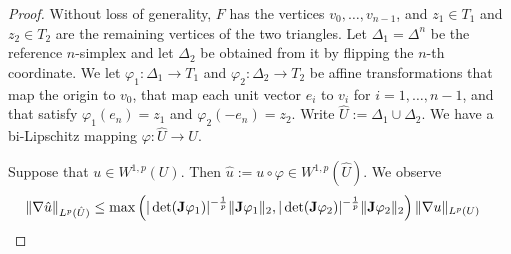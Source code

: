 \documentclass[10pt,a4paper]{article}
\begin{document}
\begin{proof}
    Without loss of generality, $F$ has the vertices $v_0, \dots, v_{n-1}$,
    and $z_{1} \in T_{1}$ and $z_{2} \in T_{2}$ are the remaining vertices of the two triangles. 
    Let $\Delta_{1} = \Delta^{n}$ be the reference $n$-simplex and let $\Delta_{2}$ be obtained from it by flipping the $n$-th coordinate.
    We let $\varphi_{1} : \Delta_{1} \rightarrow T_{1}$ and $\varphi_{2} : \Delta_{2} \rightarrow T_{2}$
    be affine transformations 
    that map the origin to $v_0$, that map each unit vector $e_{i}$ to $v_{i}$ for $i = 1, \dots, n-1$,
    and that satisfy $\varphi_{1}(e_{n}) = z_{1}$ and $\varphi_{2}(-e_{n}) = z_{2}$.
    Write $\hat U := \Delta_1 \cup \Delta_2$.
    We have a bi-Lipschitz mapping $\varphi : \hat U \rightarrow U$. 
    
    Suppose that $u \in W^{1,p}(U)$. Then $\hat u := u \circ \varphi \in W^{1,p}(\hat U)$. 
    We observe 
    \begin{align*}
        \| \nabla \hat u \|_{L^{p}(\hat U)}
        &\leq 
        \max\left( 
            |\det(\Jacobian \varphi_1)|^{-\frac 1 p} \matnorm{ \Jacobian \varphi_1 }
            ,
            |\det(\Jacobian \varphi_2)|^{-\frac 1 p} \matnorm{ \Jacobian \varphi_2 }
        \right)
        \| \nabla u \|_{L^{p}(U)}

\end{align*}
\end{proof}
\end{document}

